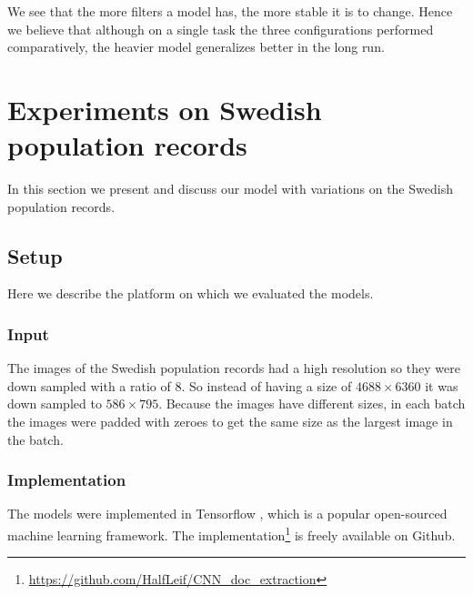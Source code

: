 We see that the more filters a model has, the more stable it is to change. Hence we believe that although on a single task the three configurations performed comparatively, the heavier model generalizes better in the long run.






\section{Experiments on Swedish population records} \label{sec:experiments}

In this section we present and discuss our model with variations on the Swedish population records.

\subsection{Setup}
 Here we describe the platform on which we evaluated the models.

\subsubsection{Input}
The images of the Swedish population records had a high resolution so they were down sampled with a ratio of 8. So instead of having a size of $4688 \times 6360$ it was down sampled to $586 \times 795$. Because the images have different sizes, in each batch the images were padded with zeroes to get the same size as the largest image in the batch.

\subsubsection{Implementation}
The models were implemented in Tensorflow \cite{Tensorflow}, which is a popular open-sourced machine learning framework. The implementation\footnote{\url{https://github.com/HalfLeif/CNN_doc_extraction}} is freely available on Github.

